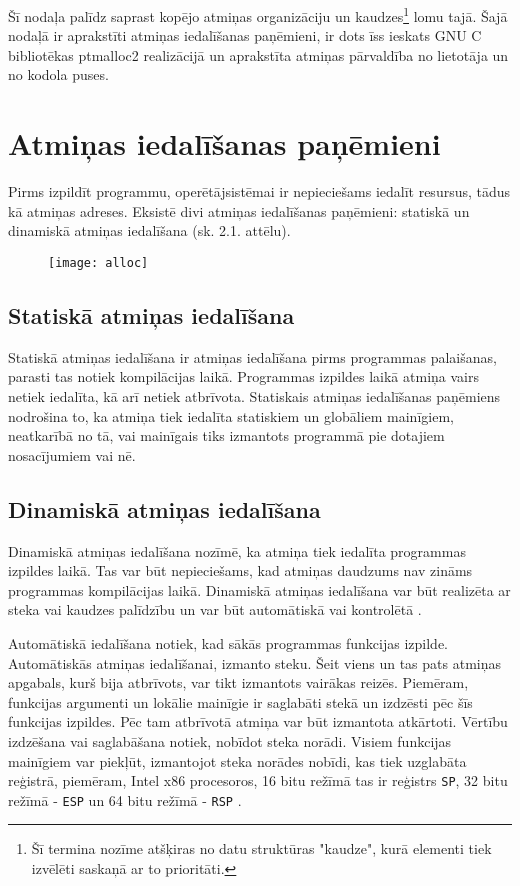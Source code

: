 ﻿Šī nodaļa palīdz saprast kopējo atmiņas organizāciju un kaudzes\footnote{Šī termina nozīme atšķiras no datu struktūras "kaudze", kurā elementi tiek izvēlēti saskaņā ar to prioritāti.} lomu tajā. 
Šajā nodaļā ir aprakstīti atmiņas iedalīšanas paņēmieni, ir dots īss ieskats GNU C bibliotēkas ptmalloc2 realizācijā un aprakstīta atmiņas pārvaldība no lietotāja un no kodola puses.

\section{Atmiņas iedalīšanas paņēmieni}

Pirms izpildīt programmu, operētājsistēmai ir nepieciešams iedalīt resursus, tādus kā atmiņas adreses.  
Eksistē divi atmiņas iedalīšanas paņēmieni: statiskā un dinamiskā atmiņas iedalīšana (sk. 2.1. attēlu). 

\begin{figure}[h]
\begin{center}
\texttt{[image: alloc]}
\end{center}
\caption{\textbf{\fontsize{11}{12}\selectfont {Atmiņas iedalīšanas paņēmienu klasifikācija}}}
\label{fig:alloc}
\end{figure}


\subsection{Statiskā atmiņas iedalīšana}
Statiskā atmiņas iedalīšana ir atmiņas iedalīšana pirms programmas palaišanas, parasti tas notiek kompilācijas laikā.
Programmas izpildes laikā atmiņa vairs netiek iedalīta, kā arī netiek atbrīvota. 
Statiskais atmiņas iedalīšanas paņēmiens nodrošina to, ka atmiņa tiek iedalīta statiskiem un globāliem mainīgiem, neatkarībā no tā, vai mainīgais tiks izmantots programmā pie dotajiem nosacījumiem vai nē.

\subsection{Dinamiskā atmiņas iedalīšana}
Dinamiskā atmiņas iedalīšana nozīmē, ka atmiņa tiek iedalīta programmas izpildes laikā.
Tas var būt nepieciešams, kad atmiņas daudzums nav zināms programmas kompilācijas laikā. 
Dinamiskā atmiņas iedalīšana var būt realizēta ar steka vai kaudzes palīdzību un var būt automātiskā vai kontrolētā \cite{SDMA}.

Automātiskā iedalīšana notiek, kad sākās programmas funkcijas izpilde. 
Automātiskās atmiņas iedalīšanai, izmanto steku.
Šeit viens un tas pats atmiņas apgabals, kurš bija atbrīvots, var tikt izmantots  vairākas reizēs. 
Piemēram, funkcijas argumenti un lokālie mainīgie ir saglabāti stekā un izdzēsti pēc šīs funkcijas izpildes. 
Pēc tam atbrīvotā atmiņa var būt izmantota atkārtoti. 
Vērtību izdzēšana vai saglabāšana notiek, nobīdot steka norādi.
Visiem funkcijas mainīgiem var piekļūt, izmantojot steka norādes nobīdi, kas tiek uzglabāta reģistrā, piemēram,  
Intel x86 procesoros, 16 bitu režīmā tas ir reģistrs \texttt{SP}, 32 bitu režīmā - \texttt{ESP} un 64 bitu režīmā - \texttt{RSP} \cite{JCL}.


